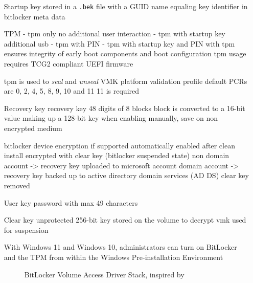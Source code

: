 \begin{itemize}
    \item[Startup key] stored in a \lstinline{.bek} file with a \ac{GUID} name equaling key identifier in bitlocker meta data
        \cite[2.6. Startup key]{bde-format-spec}
    \item[TPM]
        - tpm only
        no additional user interaction
        - tpm with startup key
        additional usb
        - tpm with PIN
        - tpm with startup key and PIN
        \cite{microsoft-bitlocker-countermeasures}
        with tpm ensures integrity of early boot components and boot configuration
        tpm usage requires \ac{TCG2} compliant \ac{UEFI} firmware \cite[9. TPM]{windows-internals-6-part2}

        tpm is used to \emph{seal} and \emph{unseal} \ac{VMK}
        platform validation profile
        default \acp{PCR} are 0, 2, 4, 5, 8, 9, 10 and 11
        11 is required
    \item[Recovery key] recovery key 48 digits of 8 blocks
        block is converted to a 16-bit value making up a 128-bit key
        \cite[2.4. Recovery key]{bde-format-spec}
        when enabling manually, save on non encrypted medium
        \cite{microsoft-bitlocker-basic-deployment}

        bitlocker device encryption if supported automatically enabled
        after clean install encrypted with clear key (bitlocker suspended state)
        non domain account -> recovery key uploaded to microsoft account
        domain account -> recovery key backed up to active directory domain services (AD DS)
        clear key removed
        \cite{microsoft-bitlocker-device-encryption}

    \item[User key] password with max 49 characters
        \cite[2.7. User key]{bde-format-spec}
    \item[Clear key] unprotected 256-bit key stored on the volume to decrypt vmk
        \cite[2.5. Clear key]{bde-format-spec}
        used for suspension


         With Windows 11 and Windows 10, administrators can turn on BitLocker and the TPM from within the Windows Pre-installation Environment \cite{microsoft-bitlocker-device-encryption}

        \begin{figure}[htb]%
            \centering
            
            \caption{BitLocker Volume Access Driver Stack, inspired by \cite[Figure 9-24]{windows-internals-6-part2}}%
            \label{fig:bitlocker-volume-access-driver-stack}%
        \end{figure}

\end{itemize}